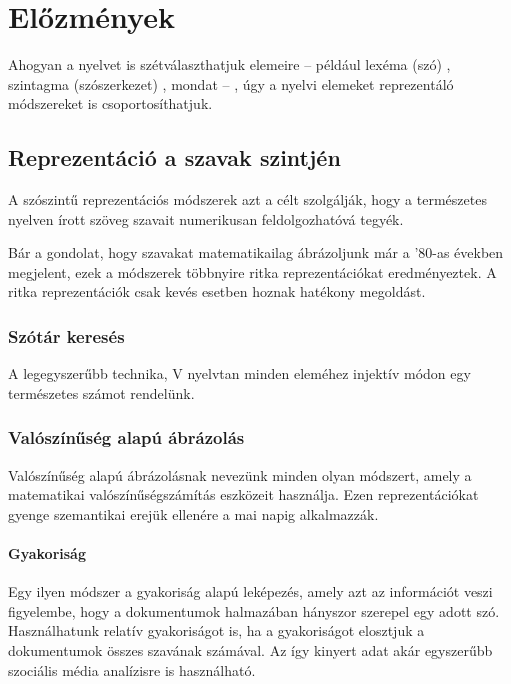 \chapter{Előzmények}
\label{ch:related_work}

Ahogyan a nyelvet is szétválaszthatjuk elemeire – például lexéma (szó) , szintagma (szószerkezet) , mondat – , úgy a nyelvi elemeket reprezentáló módszereket is csoportosíthatjuk. 


\section{Reprezentáció a szavak szintjén}

A szószintű reprezentációs módszerek azt a célt szolgálják, hogy a természetes nyelven írott szöveg szavait numerikusan feldolgozhatóvá tegyék.

Bár a gondolat, hogy szavakat matematikailag ábrázoljunk már a '80-as években megjelent, ezek a módszerek többnyire ritka reprezentációkat eredményeztek. A ritka reprezentációk csak kevés esetben hoznak hatékony megoldást.

\subsection{Szótár keresés}

A legegyszerűbb technika, V nyelvtan minden eleméhez injektív módon egy természetes számot rendelünk.

\subsection{Valószínűség alapú ábrázolás}

Valószínűség alapú ábrázolásnak nevezünk minden olyan módszert, amely a matematikai valószínűségszámítás eszközeit használja. Ezen reprezentációkat gyenge szemantikai erejük ellenére a mai napig alkalmazzák.

\subsubsection{Gyakoriság}

Egy ilyen módszer a gyakoriság alapú leképezés, amely azt az információt veszi figyelembe, hogy a dokumentumok halmazában hányszor szerepel egy adott szó. Használhatunk relatív gyakoriságot is, ha a gyakoriságot elosztjuk a dokumentumok összes szavának számával. Az így kinyert adat akár egyszerűbb szociális média analízisre is használható.


